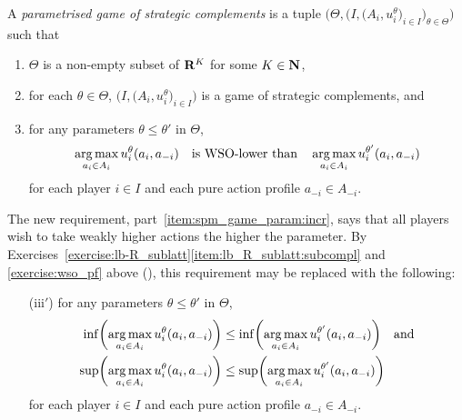 \begin{definition}
	\label{definition:spm_game_param}
	A \emph{parametrised game of strategic complements} is a tuple $\bigl( \Theta, \bigl( I,\bigl(A_i,u_i^\theta\bigr)_{i \in I} \bigr)_{\theta \in \Theta} \bigr)$ such that

	\begin{enumerate}[label=(\roman*)]
	
		\item \label{item:spm_game_param:Theta} $\Theta$ is a non-empty subset of $\mathbf{R}^K$ for some $K \in \mathbf{N}$,

		\item \label{item:spm_game_param:spm} for each $\theta \in \Theta$, $\bigl( I,\bigl(A_i,u_i^\theta\bigr)_{i \in I} \bigr)$ is a game of strategic complements, and

		\item \label{item:spm_game_param:incr} for any parameters $\theta \leq \theta'$ in $\Theta$,
		\begin{equation*}
			\operatorname*{arg\,max}_{a_i \in A_i} u_i^\theta(a_i,a_{-i})
			\quad \text{is WSO-lower than} \quad
			\operatorname*{arg\,max}_{a_i \in A_i} u_i^{\theta'}(a_i,a_{-i})
		\end{equation*}
		for each player $i \in I$ and each pure action profile $a_{-i} \in A_{-i}$.
	
	\end{enumerate}
\end{definition}

The new requirement, part~\ref{item:spm_game_param:incr}, says that all players wish to take weakly higher actions the higher the parameter. By Exercises~\ref{exercise:lb-R_sublatt}\ref{item:lb_R_sublatt:subcompl} and \ref{exercise:wso_pf} above (), this requirement may be replaced with the following:

\begin{itemize}

	\item[(iii$'$)] for any parameters $\theta \leq \theta'$ in $\Theta$,
	\begin{align*}
		\inf \left( \argmax_{a_i \in A_i} u_i^\theta(a_i,a_{-i}) \right)
		&\leq \inf \left( \argmax_{a_i \in A_i} u_i^{\theta'}(a_i,a_{-i}) \right)
		\quad \text{and} \\
		\sup \left( \argmax_{a_i \in A_i} u_i^\theta(a_i,a_{-i}) \right)
		&\leq \sup \left( \argmax_{a_i \in A_i} u_i^{\theta'}(a_i,a_{-i}) \right) 
	\end{align*}
	for each player $i \in I$ and each pure action profile $a_{-i} \in A_{-i}$.

\end{itemize}

